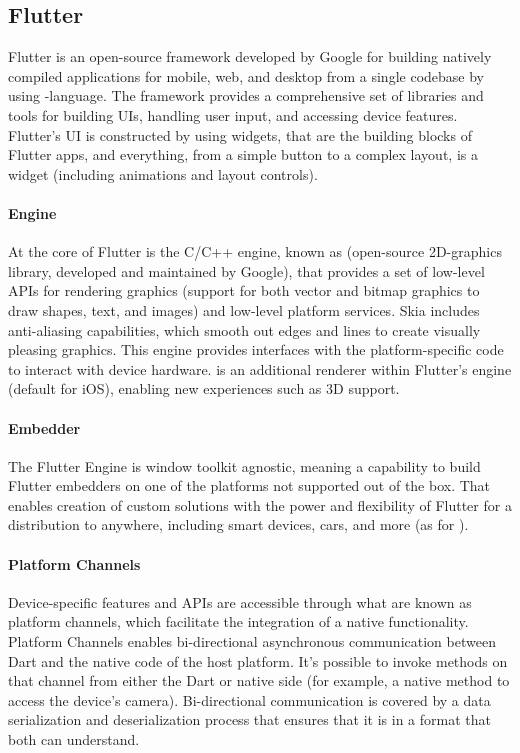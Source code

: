 
\subsection{Flutter}

Flutter is an open-source framework developed by Google for building natively compiled applications for mobile, web, and 
desktop from a single codebase by using -language. The framework provides a comprehensive set of libraries and 
tools for building UIs, handling user input, and accessing device features. Flutter's UI is constructed by using widgets, 
that are the building blocks of Flutter apps, and everything, from a simple button to a complex layout, is a widget
(including animations and layout controls).

\paragraph{Engine} At the core of Flutter is the C/C++ engine, known as  (open-source 2D-graphics library, 
developed and maintained by Google), that provides a set of low-level APIs for rendering graphics (support for both 
vector and bitmap graphics to draw shapes, text, and images) and low-level platform services. Skia includes 
anti-aliasing capabilities, which smooth out edges and lines to create visually pleasing graphics. This engine provides 
interfaces with the platform-specific code to interact with device hardware.  is an additional renderer 
within Flutter's engine (default for iOS), enabling new experiences such as 3D support.

\paragraph{Embedder} The Flutter Engine is window toolkit agnostic, meaning a capability to build Flutter embedders on 
one of the platforms not supported out of the box. That enables creation of custom solutions with the power and 
flexibility of Flutter for a distribution to anywhere, including smart devices, cars, and more (as  
for ).

\paragraph{Platform Channels} Device-specific features and APIs are accessible through what are known as platform channels, 
which facilitate the integration of a native functionality. Platform Channels enables bi-directional asynchronous 
communication between Dart and the native code of the host platform. It's possible to invoke methods on that channel 
from either the Dart or native side (for example, a native method to access the device's camera). Bi-directional 
communication is covered by a data serialization and deserialization process that ensures that it is in a format that 
both can understand.

